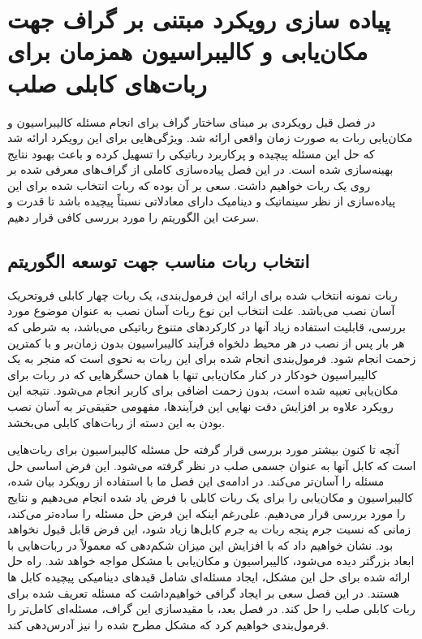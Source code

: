 \chapter{پیاده سازی رویکرد مبتنی بر گراف جهت مکان‌یابی و کالیبراسیون همزمان برای ربات‌های کابلی صلب}

در فصل قبل رویکردی بر مبنای ساختار گراف برای انجام مسئله کالیبراسیون و مکان‌یابی ربات به صورت زمان واقعی ارائه شد. ویژگی‌هایی برای این رویکرد ارائه شد که حل این مسئله پیچیده و پرکاربرد رباتیکی را تسهیل کرده و باعث بهبود نتایج بهینه‌سازی شده است. در این فصل پیاده‌سازی کاملی از گراف‌های معرفی شده بر روی یک ربات خواهیم داشت. سعی بر آن بوده که ربات انتخاب شده برای این پیاده‌سازی از نظر سینماتیک و دینامیک دارای معادلاتی نسبتاً پیچیده باشد تا قدرت و سرعت این الگوریتم را مورد بررسی کافی قرار دهیم.


\section{انتخاب ربات مناسب جهت توسعه الگوریتم}

ربات نمونه انتخاب شده برای ارائه این فرمول‌بندی، یک ربات چهار کابلی فروتحریک آسان نصب می‌باشد. علت انتخاب این نوع ربات آسان نصب به عنوان موضوع مورد بررسی، قابلیت استفاده زیاد آنها در کارکردهای متنوع رباتیکی می‌باشد، به شرطی که هر بار پس از نصب در هر محیط دلخواه فرآیند کالیبراسیون بدون زمان‌بر و با کمترین زحمت انجام شود. فرمول‌بندی انجام شده برای این ربات به نحوی است که منجر به یک کالیبراسیون خودکار در کنار مکان‌یابی تنها با همان حسگرهایی که در ربات برای مکان‌یابی تعبیه شده است، بدون زحمت اضافی برای کاربر انجام می‌شود. نتیجه این رویکرد علاوه بر افزایش دقت نهایی این فرآیندها، مفهومی حقیقی‌تر به آسان نصب بودن به این دسته از ربات‌های کابلی می‌بخشد.

آنچه تا کنون بیشتر مورد بررسی قرار گرفته حل مسئله کالیبراسیون برای ربات‌هایی است که کابل آنها به عنوان جسمی صلب در نظر گرفته می‌شود. این فرض اساسی حل مسئله را آسان‌تر می‌کند. در ادامه‌ی این فصل ما با استفاده از رویکرد بیان شده، کالیبراسیون و مکان‌یابی را برای یک ربات کابلی با فرض یاد شده انجام می‌دهیم و نتایج را مورد بررسی قرار می‌دهیم. علی‌رغم اینکه این فرض حل مسئله را ساده‌تر می‌کند، زمانی که نسبت جرم پنجه ربات به جرم کابل‌ها زیاد شود، این فرض قابل قبول نخواهد بود. نشان خواهیم داد که با افزایش این میزان شکم‌دهی که معمولاً در ربات‌هایی با ابعاد بزرگتر دیده می‌شود، کالیبراسیون و مکان‌یابی با مشکل مواجه خواهد شد. راه حل ارائه شده برای حل این مشکل، ایجاد مسئله‌ای شامل قیدهای دینامیکی پیچیده کابل ها هستند. در این فصل سعی بر ایجاد گرافی خواهیم‌داشت که مسئله تعریف شده برای ربات کابلی صلب را حل کند. در فصل بعد، با مقید‌سازی این گراف، مسئله‌ای کامل‌تر  را فرمول‌بندی خواهیم کرد که مشکل مطرح شده را نیز آدرس‌دهی کند.


